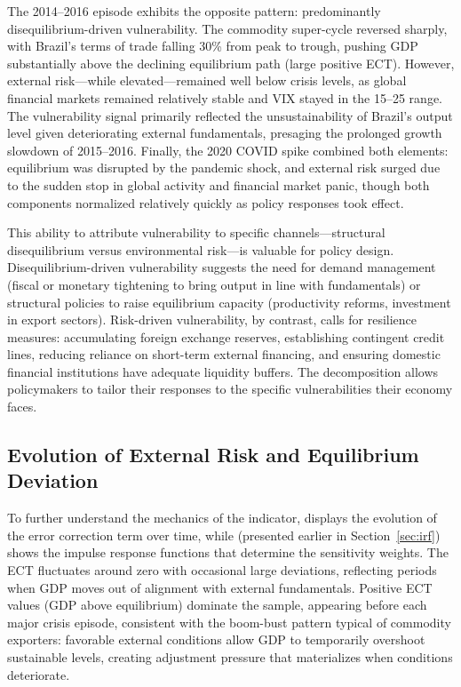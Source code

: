 \documentclass[12pt,a4paper]{article}
\numberwithin{equation}{section}
\theoremstyle{definition}
\theoremstyle{remark}
\begin{document}
The 2014--2016 episode exhibits the opposite pattern: predominantly disequilibrium-driven vulnerability. The commodity super-cycle reversed sharply, with Brazil's terms of trade falling 30\% from peak to trough, pushing GDP substantially above the declining equilibrium path (large positive ECT). However, external risk---while elevated---remained well below crisis levels, as global financial markets remained relatively stable and VIX stayed in the 15--25 range. The vulnerability signal primarily reflected the unsustainability of Brazil's output level given deteriorating external fundamentals, presaging the prolonged growth slowdown of 2015--2016. Finally, the 2020 COVID spike combined both elements: equilibrium was disrupted by the pandemic shock, and external risk surged due to the sudden stop in global activity and financial market panic, though both components normalized relatively quickly as policy responses took effect.

This ability to attribute vulnerability to specific channels---structural disequilibrium versus environmental risk---is valuable for policy design. Disequilibrium-driven vulnerability suggests the need for demand management (fiscal or monetary tightening to bring output in line with fundamentals) or structural policies to raise equilibrium capacity (productivity reforms, investment in export sectors). Risk-driven vulnerability, by contrast, calls for resilience measures: accumulating foreign exchange reserves, establishing contingent credit lines, reducing reliance on short-term external financing, and ensuring domestic financial institutions have adequate liquidity buffers. The decomposition allows policymakers to tailor their responses to the specific vulnerabilities their economy faces.


\subsection{Evolution of External Risk and Equilibrium Deviation}

To further understand the mechanics of the indicator,  displays the evolution of the error correction term over time, while  (presented earlier in Section~\ref{sec:irf}) shows the impulse response functions that determine the sensitivity weights. The ECT fluctuates around zero with occasional large deviations, reflecting periods when GDP moves out of alignment with external fundamentals. Positive ECT values (GDP above equilibrium) dominate the sample, appearing before each major crisis episode, consistent with the boom-bust pattern typical of commodity exporters: favorable external conditions allow GDP to temporarily overshoot sustainable levels, creating adjustment pressure that materializes when conditions deteriorate.
\end{document}
